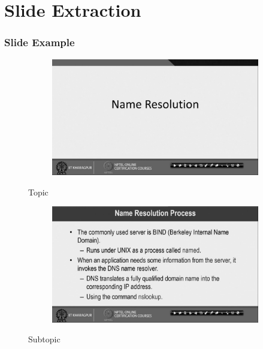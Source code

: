 \documentclass{beamer}
\begin{document}
\section{Slide Extraction}
\begin{frame}
\frametitle{Slide Example}
\begin{figure}[h!]
	\centering
	\begin{subfigure}[b]{0.45\linewidth}
		\includegraphics[width=\linewidth]{Presentation_Image/topic.jpg}
	\end{subfigure}
	\caption{Topic}
	\begin{subfigure}[b]{0.45\linewidth}
		\includegraphics[width=\linewidth]{Presentation_Image/subtopic.jpg}
	\end{subfigure}
	\caption{Subtopic}
\end{figure}
\end{frame}
\end{document}
